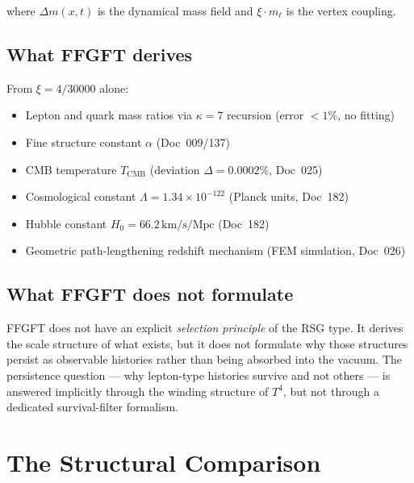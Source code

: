 where $\Delta m(x,t)$ is the dynamical mass field and $\xi \cdot m_\ell$ is
the vertex coupling.

\subsection{What FFGFT derives}

From $\xi = 4/30000$ alone:

\begin{itemize}
  \item Lepton and quark mass ratios via $\kappa=7$ recursion (error $<1\%$, no fitting)
  \item Fine structure constant $\alpha$ (Doc~009/137)
  \item CMB temperature $T_\text{CMB}$ (deviation $\Delta = 0.0002\%$, Doc~025)
  \item Cosmological constant $\Lambda = 1.34\times10^{-122}$ (Planck units, Doc~182)
  \item Hubble constant $H_0 = 66.2\,\text{km/s/Mpc}$ (Doc~182)
  \item Geometric path-lengthening redshift mechanism (FEM simulation, Doc~026)
\end{itemize}

\subsection{What FFGFT does not formulate}

FFGFT does not have an explicit \emph{selection principle} of the RSG type. It
derives the scale structure of what exists, but it does not formulate why
those structures persist as observable histories rather than being absorbed
into the vacuum. The persistence question — why lepton-type histories survive
and not others — is answered implicitly through the winding structure of $T^4$,
but not through a dedicated survival-filter formalism.

\section{The Structural Comparison}

